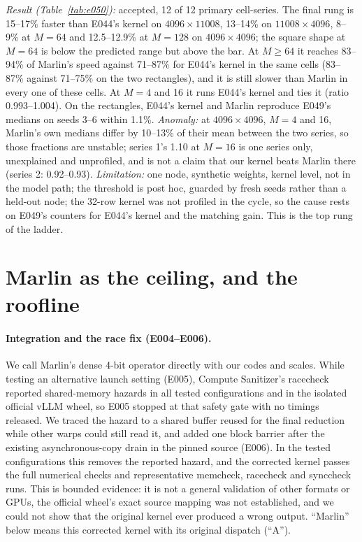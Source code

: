 \documentclass[sigconf,nonacm]{acmart}
\begin{document}
\emph{Result (Table~\ref{tab:e050}):} accepted, 12 of 12 primary cell-series. The final rung is 15--17\% faster than E044's kernel on $4096\times11008$, 13--14\% on $11008\times4096$, 8--9\% at $M=64$ and 12.5--12.9\% at $M=128$ on $4096\times4096$; the square shape at $M=64$ is below the predicted range but above the bar. At $M \ge 64$ it reaches 83--94\% of Marlin's speed against 71--87\% for E044's kernel in the same cells (83--87\% against 71--75\% on the two rectangles), and it is still slower than Marlin in every one of these cells. At $M=4$ and 16 it runs E044's kernel and ties it (ratio 0.993--1.004). On the rectangles, E044's kernel and Marlin reproduce E049's medians on seeds 3--6 within 1.1\%. \emph{Anomaly:} at $4096\times4096$, $M=4$ and 16, Marlin's own medians differ by 10--13\% of their mean between the two series, so those fractions are unstable; series 1's 1.10 at $M=16$ is one series only, unexplained and unprofiled, and is not a claim that our kernel beats Marlin there (series 2: 0.92--0.93). \emph{Limitation:} one node, synthetic weights, kernel level, not in the model path; the threshold is post hoc, guarded by fresh seeds rather than a held-out node; the 32-row kernel was not profiled in the cycle, so the cause rests on E049's counters for E044's kernel and the matching gain. This is the top rung of the ladder.

\section{Marlin as the ceiling, and the roofline}
\label{sec:ceiling}
\paragraph{Integration and the race fix (E004--E006).} We call Marlin's dense 4-bit operator directly with our codes and scales. While testing an alternative launch setting (E005), Compute Sanitizer's racecheck~\cite{sanitizer} reported shared-memory hazards in all tested configurations and in the isolated official vLLM wheel, so E005 stopped at that safety gate with no timings released. We traced the hazard to a shared buffer reused for the final reduction while other warps could still read it, and added one block barrier after the existing asynchronous-copy drain in the pinned source (E006). In the tested configurations this removes the reported hazard, and the corrected kernel passes the full numerical checks and representative memcheck, racecheck and synccheck runs. This is bounded evidence: it is not a general validation of other formats or GPUs, the official wheel's exact source mapping was not established, and we could not show that the original kernel ever produced a wrong output. ``Marlin'' below means this corrected kernel with its original dispatch (``A'').
\end{document}
